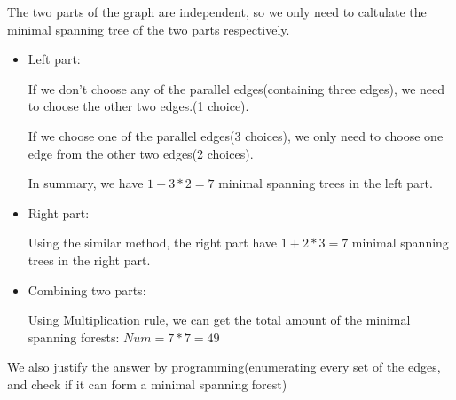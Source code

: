 The two parts of the graph are independent, so we only need to caltulate the minimal spanning tree of the two parts respectively.
\begin{itemize}
	\item Left part:\par
		If we don't choose any of the parallel edges(containing three edges), we need to choose the other two edges.(1 choice).\par
		If we choose one of the parallel edges(3 choices), we only need to choose one edge from the other two edges(2 choices).\par
		In summary, we have $1 + 3 * 2 = 7$ minimal spanning trees in the left part.
	\item Right part:\par
		Using the similar method, the right part have $1 + 2 * 3 = 7$ minimal spanning trees in the right part.
	\item Combining two parts:\par
		Using Multiplication rule, we can get the total amount of the minimal spanning forests: $Num = 7 * 7 = 49$
\end {itemize}
We also justify the answer by programming(enumerating every set of the edges, and check if it can form a minimal spanning forest)
